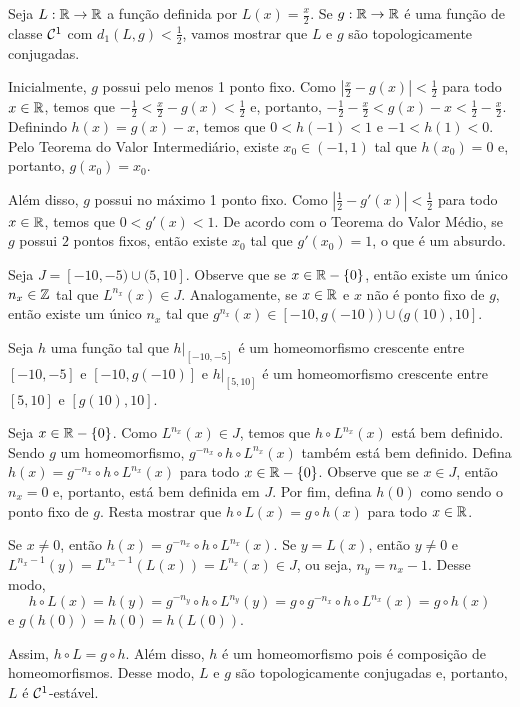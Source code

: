 \begin{example}
Seja $L: \mathbb{R} \to \mathbb{R}$ a função definida por $L(x) = \frac{x}{2}$. Se $g: \mathbb{R} \to \mathbb{R}$ é uma função de classe $\mathcal{C}^1$ com $d_1(L, g) < \frac{1}{2}$, vamos mostrar que $L$ e $g$ são topologicamente conjugadas.

Inicialmente, $g$ possui pelo menos 1 ponto fixo. Como $\left| \frac{x}{2} - g(x) \right| < \frac{1}{2}$ para todo $x \in \mathbb{R}$, temos que $-\frac{1}{2} < \frac{x}{2} - g(x) < \frac{1}{2}$ e, portanto, $-\frac{1}{2} - \frac{x}{2} < g(x) - x < \frac{1}{2} - \frac{x}{2}$. Definindo $h(x) = g(x) - x$, temos que $0 < h(-1) < 1$ e $-1 < h(1) < 0$. Pelo Teorema do Valor Intermediário, existe $x_0 \in (-1, 1)$ tal que $h(x_0) = 0$ e, portanto, $g(x_0) = x_0$.

Além disso, $g$ possui no máximo 1 ponto fixo. Como $\left| \frac{1}{2} - g'(x) \right| < \frac{1}{2}$ para todo $x \in \mathbb{R}$, temos que $0 < g'(x) < 1$. De acordo com o Teorema do Valor Médio, se $g$ possui $2$ pontos fixos, então existe $x_0$ tal que $g'(x_0) = 1$, o que é um absurdo.

Seja $J = [-10, -5) \cup (5, 10]$. Observe que se $x \in \mathbb{R} - \{0\}$, então existe um único $n_x \in \mathbb{Z}$ tal que $L^{n_x}(x) \in J$. Analogamente, se $x \in \mathbb{R}$ e $x$ não é ponto fixo de $g$, então existe um único $n_x$ tal que $g^{n_x}(x) \in [-10, g(-10)) \cup (g(10), 10]$.

Seja $h$ uma função tal que $h|_{[-10, -5]}$ é um homeomorfismo crescente entre $[-10, -5]$ e $[-10, g(-10)]$ e $h|_{[5, 10]}$ é um homeomorfismo crescente entre $[5, 10]$ e $[g(10), 10]$.

Seja $x \in \mathbb{R} - \{0\}$. Como $L^{n_x}(x) \in J$, temos que $h \circ L^{n_x}(x)$ está bem definido. Sendo $g$ um homeomorfismo, $g^{-n_x} \circ h \circ L^{n_x}(x)$ também está bem definido. Defina $h(x) = g^{-n_x} \circ h \circ L^{n_x}(x)$ para todo $x \in \mathbb{R} - \{0\}$. Observe que se $x \in J$, então $n_x = 0$ e, portanto, está bem definida em $J$. Por fim, defina $h(0)$ como sendo o ponto fixo de $g$. Resta mostrar que $h \circ L(x) = g \circ h(x)$ para todo $x \in \mathbb{R}$.

Se $x \neq 0$, então $h(x) = g^{-n_x} \circ h \circ L^{n_x}(x)$. Se $y = L(x)$, então $y \neq 0$ e $L^{n_x - 1}(y) = L^{n_x - 1}(L(x)) = L^{n_x}(x) \in J$, ou seja, $n_y = n_x - 1$. Desse modo,
$$h \circ L(x) = h(y) = g^{-n_y} \circ h \circ L^{n_y}(y) = g \circ g^{-n_x} \circ h \circ L^{n_x}(x) = g \circ h(x)$$
e $g(h(0)) = h(0) = h(L(0))$.

Assim, $h \circ L = g \circ h$. Além disso, $h$ é um homeomorfismo pois é composição de homeomorfismos. Desse modo, $L$ e $g$ são topologicamente conjugadas e, portanto, $L$ é $\mathcal{C}^1$-estável.
\end{example}

